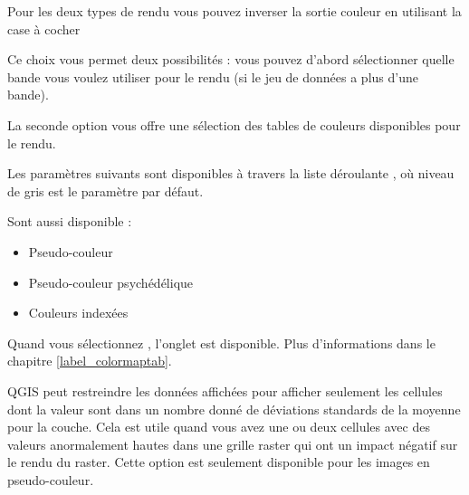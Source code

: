 Pour les deux types de rendu vous pouvez inverser la sortie couleur en
utilisant la case à cocher 


Ce choix vous permet deux possibilités : vous pouvez d'abord sélectionner
quelle bande vous voulez utiliser pour le rendu (si le jeu de données a plus
d'une bande).

La seconde option vous offre une sélection des tables de couleurs disponibles
pour le rendu.

Les paramètres suivants sont disponibles à travers la liste déroulante
, où niveau de gris est le 
paramètre par défaut.

Sont aussi disponible :
\begin{itemize}
\item Pseudo-couleur
\item Pseudo-couleur psychédélique
\item Couleurs indexées
\end{itemize}

Quand vous sélectionnez , l'onglet
 est disponible. Plus d'informations dans le chapitre
\ref{label_colormaptab}.

QGIS peut restreindre les données affichées pour afficher seulement les
cellules dont la valeur sont dans un nombre donné de déviations standards de
la moyenne pour la couche. Cela est
utile quand vous avez une ou deux cellules avec des valeurs anormalement hautes
dans une grille raster qui ont un impact négatif sur le rendu du raster. Cette
option est seulement disponible pour les images en pseudo-couleur.

